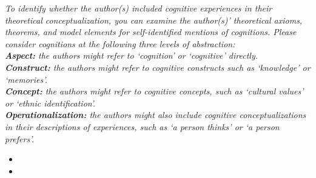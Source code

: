 \documentclass[10pt,a4paper]{protocol}
\begin{document}

\textit{To identify whether the author(s) included cognitive experiences in their theoretical conceptualization, you can examine the author(s)' theoretical axioms, theorems, and model elements for self-identified mentions of cognitions. Please consider cognitions at the following three levels of abstraction:\\
\textbf{Aspect:} the authors might refer to `cognition' or `cognitive' directly.\\
\textbf{Construct:} the authors might refer to cognitive constructs such as `knowledge' or `memories'.\\
\textbf{Concept:} the authors might refer to cognitive concepts, such as `cultural values' or `ethnic identification'.\\
\textbf{Operationalization:} the authors might also include cognitive conceptualizations in their descriptions of experiences, such as `a person thinks' or `a person prefers'.}
\vspace{0.5em}
\begin{itemize}
	\item {}
	\item {}
\end{itemize}
\divider

\end{document}
